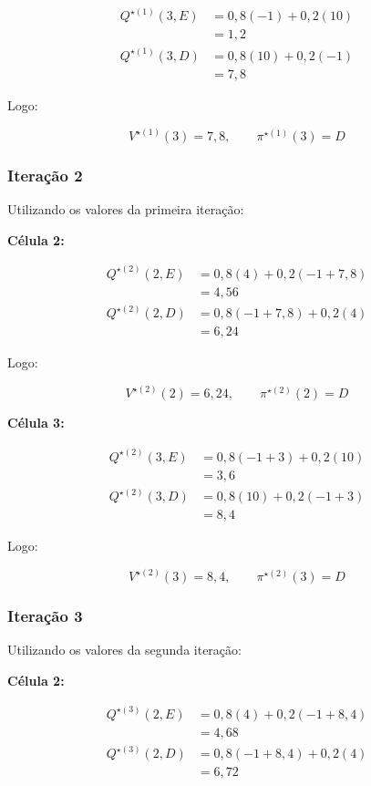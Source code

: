 \[
\begin{aligned}
Q^{\star(1)}(3,E)
&=0{,}8(-1)+0{,}2(10)\\
&=1{,}2
\\[6pt]
Q^{\star(1)}(3,D)
&=0{,}8(10)+0{,}2(-1)\\
&=7{,}8
\end{aligned}
\]

Logo:

\[
V^{\star(1)}(3)=7{,}8,
\qquad \pi^{\star(1)}(3)=D
\]

\subsubsection*{Iteração 2}

Utilizando os valores da primeira iteração:

\textbf{Célula 2:}

\[
\begin{aligned}
Q^{\star(2)}(2,E)
&=0{,}8(4)+0{,}2(-1+7{,}8)\\
&=4{,}56
\\[6pt]
Q^{\star(2)}(2,D)
&=0{,}8(-1+7{,}8)+0{,}2(4)\\
&=6{,}24
\end{aligned}
\]

Logo:

\[
V^{\star(2)}(2)=6{,}24,
\qquad \pi^{\star(2)}(2)=D
\]

\textbf{Célula 3:}

\[
\begin{aligned}
Q^{\star(2)}(3,E)
&=0{,}8(-1+3)+0{,}2(10)\\
&=3{,}6
\\[6pt]
Q^{\star(2)}(3,D)
&=0{,}8(10)+0{,}2(-1+3)\\
&=8{,}4
\end{aligned}
\]

Logo:

\[
V^{\star(2)}(3)=8{,}4,
\qquad \pi^{\star(2)}(3)=D
\]

\subsubsection*{Iteração 3}

Utilizando os valores da segunda iteração:

\textbf{Célula 2:}

\[
\begin{aligned}
Q^{\star(3)}(2,E)
&=0{,}8(4)+0{,}2(-1+8{,}4)\\
&=4{,}68
\\[6pt]
Q^{\star(3)}(2,D)
&=0{,}8(-1+8{,}4)+0{,}2(4)\\
&=6{,}72
\end{aligned}
\]

